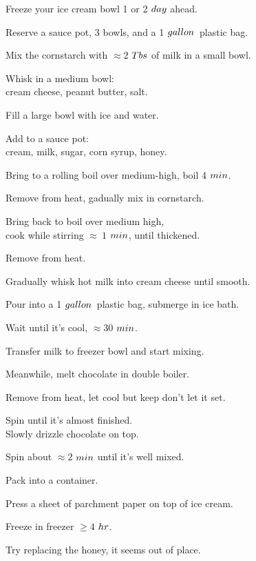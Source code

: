 \begin{preparation}
\item Freeze your ice cream bowl 1 or 2 $\Day$ ahead.
\item Reserve a sauce pot, 3 bowls, and a 1 $\gallon$~plastic bag.
\item Mix the cornstarch with $\approx 2$ $\Tablespoon$ of milk in a small bowl.
\item Whisk in a medium bowl:\\cream cheese, peanut butter, salt.
\item Fill a large bowl with ice and water.
\item Add to a sauce pot:\\cream, milk, sugar, corn syrup, honey.
\item Bring to a rolling boil over medium-high, boil 4 $\minute$.
\item Remove from heat, gadually mix in cornstarch.
\item Bring back to boil over medium high,\\cook while stirring $\approx~1$ $\minute$, until thickened.
\item Remove from heat.
\item Gradually whisk hot milk into cream cheese until smooth.
\item Pour into a 1 $\gallon$~plastic bag, submerge in ice bath.
\item Wait until it's cool, $\approx 30$ $\minute$.
\item Transfer milk to freezer bowl and start mixing.
\item Meanwhile, melt chocolate in double boiler.
\item Remove from heat, let cool but keep don't let it set.
\item Spin until it's almost finished. \\
    Slowly drizzle chocolate on top.
\item Spin about $\approx 2$ $\minute$ until it's well mixed.
\item Pack into a container.
\item Press a sheet of parchment paper on top of ice cream.
\item Freeze in freezer $\ge4$ $\hour$.
\end{preparation}

\begin{experiments}
\item Try replacing the honey, it seems out of place.
\end{experiments}

\recipeend%
